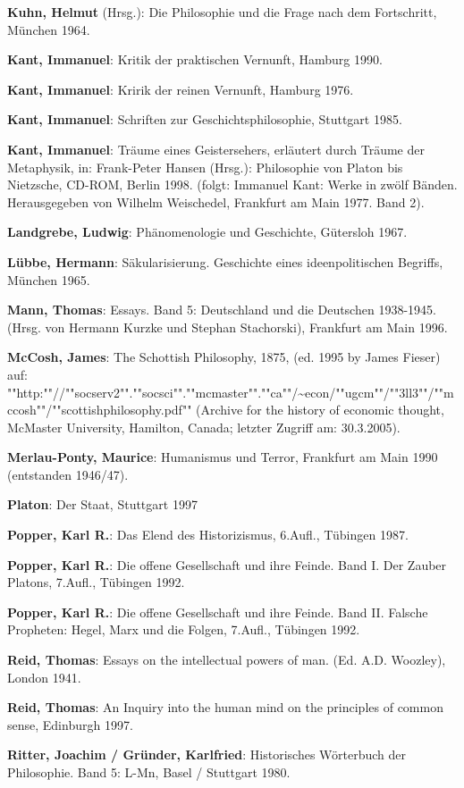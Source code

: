 {\bf Kuhn, Helmut} (Hrsg.): Die Philosophie und die Frage nach dem
Fortschritt, München 1964.

{\bf Kant, Immanuel}: Kritik der praktischen Vernunft, Hamburg 1990.

{\bf Kant, Immanuel}: Kririk der reinen Vernunft, Hamburg 1976.

{\bf Kant, Immanuel}: Schriften zur Geschichtsphilosophie, Stuttgart 1985.

{\bf Kant, Immanuel}: Träume eines Geistersehers, erläutert durch Träume der
Metaphysik, in: Frank-Peter Hansen (Hrsg.): Philosophie von Platon bis
Nietzsche, CD-ROM, Berlin 1998. (folgt: Immanuel Kant: Werke in zwölf Bänden.
Herausgegeben von Wilhelm Weischedel, Frankfurt am Main 1977. Band 2).

{\bf Landgrebe, Ludwig}: Phänomenologie und Geschichte, Gütersloh 1967.

{\bf Lübbe, Hermann}: Säkularisierung. Geschichte eines ideenpolitischen
Begriffs, München 1965.

{\bf Mann, Thomas}: Essays. Band 5: Deutschland und die Deutschen 1938-1945.
(Hrsg. von Hermann Kurzke und Stephan Stachorski), Frankfurt am Main 1996.

{\bf McCosh, James}: The Schottish Philosophy, 1875, (ed. 1995 by James
Fieser) auf: ""http:""//""socserv2"".""socsci"".""mcmaster"".""ca""/\~{ }econ/""ugcm""/""3ll3""/""mccosh""/""scottishphilosophy.pdf"" 
(Archive for
the history of economic thought, McMaster University, Hamilton, Canada;
letzter Zugriff am: 30.3.2005).

{\bf Merlau-Ponty, Maurice}: Humanismus und Terror, Frankfurt am Main 1990
(entstanden 1946/47).

{\bf Platon}: Der Staat, Stuttgart 1997

{\bf Popper, Karl R.}: Das Elend des Historizismus, 6.Aufl., Tübingen 1987.

{\bf Popper, Karl R.}: Die offene Gesellschaft und ihre Feinde. Band I. Der
Zauber Platons, 7.Aufl., Tübingen 1992.

{\bf Popper, Karl R.}: Die offene Gesellschaft und ihre Feinde. Band II.
Falsche Propheten: Hegel, Marx und die Folgen, 7.Aufl., Tübingen 1992.

{\bf Reid, Thomas}: Essays on the intellectual powers of
man. (Ed. A.D. Woozley), London 1941.

{\bf Reid, Thomas}: An Inquiry into the human mind on the principles of common
sense, Edinburgh 1997. 

{\bf Ritter, Joachim / Gründer, Karlfried}: Historisches Wörterbuch der
Philosophie. Band 5: L-Mn, Basel / Stuttgart 1980.


